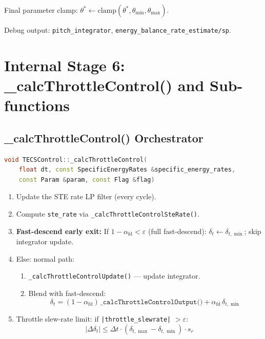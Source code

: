 \documentclass[12pt,a4paper]{article}
\begin{document}
Final parameter clamp: $\theta^* \leftarrow \text{clamp}(\theta^*, \theta_{\min}, \theta_{\max})$.

Debug output: \texttt{pitch\_integrator}, \texttt{energy\_balance\_rate\_estimate/sp}.

\section{Internal Stage 6: \_calcThrottleControl() and Sub-functions}

\subsection{\_calcThrottleControl() Orchestrator}

\begin{lstlisting}[language=C++]
void TECSControl::_calcThrottleControl(
    float dt, const SpecificEnergyRates &specific_energy_rates,
    const Param &param, const Flag &flag)
\end{lstlisting}

\begin{enumerate}
  \item Update the STE rate LP filter (every cycle).
  \item Compute \texttt{ste\_rate} via
        \texttt{\_calcThrottleControlSteRate()}.
  \item \textbf{Fast-descend early exit:}
        If $1 - \alpha_{\text{fd}} < \varepsilon$ (full fast-descend):
        $\delta_t \leftarrow \delta_{t,\min}$; skip integrator update.
  \item Else: normal path:
        \begin{enumerate}
          \item \texttt{\_calcThrottleControlUpdate()} --- update integrator.
          \item Blend with fast-descend:
                \begin{equation}
                  \delta_t = (1 - \alpha_{\text{fd}})\,
                    \texttt{\_calcThrottleControlOutput()} +
                    \alpha_{\text{fd}}\,\delta_{t,\min}
                \end{equation}
        \end{enumerate}
  \item Throttle slew-rate limit:
        if \texttt{|throttle\_slewrate|} $> \varepsilon$:
        \begin{equation}
          |\Delta\delta_t| \leq \Delta t \cdot (\delta_{t,\max} - \delta_{t,\min}) \cdot s_r
        \end{equation}
\end{enumerate}
\end{document}
